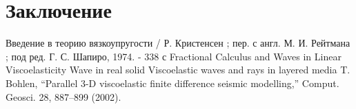 \documentclass[a4paper, fontsize=14pt]{article}
\begin{document}
\newpage
\section*{Заключение}

\newpage


\begin{thebibliography}{9}
     Введение в теорию вязкоупругости / Р. Кристенсен ; пер. с англ. М. И. Рейтмана ; под ред. Г. С. Шапиро, 1974. - 338 с
     Fractional Calculus and Waves in Linear Viscoelasticity
     Wave in real solid
     Viscoelastic waves and rays in layered media
     T. Bohlen, “Parallel 3-D viscoelastic finite difference seismic modelling,” Comput. Geosci. 28, 887–899
    (2002).
\end{thebibliography}
\end{document}
